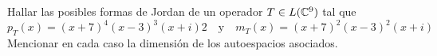 \item Hallar las posibles formas de Jordan de un operador $T\in L(\mathbb{C}^9)$ tal que\[p_T(x)=(x+7)^4(x-3)^3(x+i)2\quad\text{y}\quad m_T(x)=(x+7)^2(x-3)^2(x+i)\]
    Mencionar en cada caso la dimensión de los autoespacios asociados.
    \begin{mdframed}[style=s]
        
    \end{mdframed}